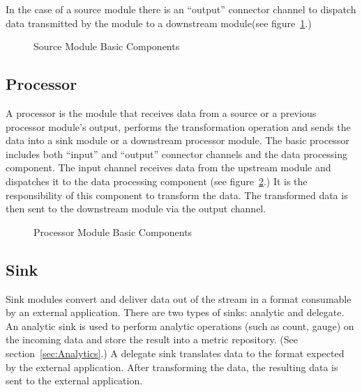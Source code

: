 \par

In the case of a source module there is an ``output'' connector channel to dispatch data
transmitted by the module to a downstream module(see figure~\ref{fig:sourcembc}.)

\par

\begin{figure}[ht]
\centering
{}
\caption{Source Module Basic Components}
\label{fig:sourcembc}
\end{figure}

\par

\subsection{Processor}
\label{sec:Processor}
A processor is the module that receives data from a source or a previous processor
module's output, performs the transformation operation and sends the data
into a sink module or a downstream processor module. The basic processor
includes both ``input'' and ``output'' connector channels and the data processing component.
The input channel receives data from the upstream module and dispatches it to
the data processing component (see figure~\ref{fig:processormbc}.) It is the responsibility of
this component to transform the data. The transformed data is then sent to the downstream module
via the output channel.

\par

\begin{figure}
\centering
{}
\caption{Processor Module Basic Components}
\label{fig:processormbc}
\end{figure}

\par

\subsection{Sink}
Sink modules convert and deliver data out of the stream in a format consumable by
an external application.  There are two types of sinks: analytic and delegate.
An analytic sink is used to perform analytic operations (such as count, gauge) on the
incoming data and store the result into a metric repository. (See section~\ref{sec:Analytics}.)
A delegate sink translates data to the format expected by the external application.
After transforming the data, the resulting data is sent to the external application.

